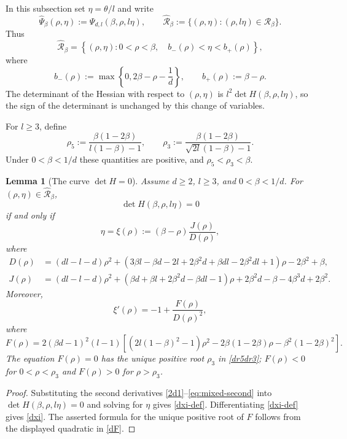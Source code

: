 \documentclass[11pt]{amsart}
\theoremstyle{plain}
\newtheorem{lemma}[theorem]{Lemma}
\numberwithin{equation}{section}
\numberwithin{theorem}{section}
\numberwithin{figure}{section}
\begin{document}
In this subsection set $\eta=\theta/l$ and write
\[
\widehat\Psi_\beta(\rho,\eta):=\Psi_{d,l}(\beta,\rho,l\eta),
\qquad
\widehat{\mathcal R}_\beta:=\{(\rho,\eta):(\rho,l\eta)\in\mathcal R_\beta\}.
\]
Thus
\[
\widehat{\mathcal R}_\beta=
\left\{(\rho,\eta):0<\rho<\beta,
\quad b_-(\rho)<\eta<b_+(\rho)\right\},
\]
where
\[
b_-(\rho):=\max\left\{0,2\beta-\rho-\frac1d\right\},
\qquad b_+(\rho):=\beta-\rho.
\]
The determinant of the Hessian with respect to $(\rho,\eta)$ is $l^2\det H(\beta,\rho,l\eta)$, so the sign of the determinant is unchanged by this change of variables.

For $l\geq3$, define
\begin{equation}
\rho_5:=\frac{\beta(1-2\beta)}{l(1-\beta)-1},
\qquad
\rho_3:=\frac{\beta(1-2\beta)}{\sqrt{2l}(1-\beta)-1}.
\label{dr5dr3}
\end{equation}
Under $0<\beta<1/d$ these quantities are positive, and $\rho_5<\rho_3<\beta$.

\begin{lemma}[The curve $\det H=0$]\label{l26}
Assume $d\geq2$, $l\geq3$, and $0<\beta<1/d$.  For $(\rho,\eta)\in\widehat{\mathcal R}_\beta$,
\begin{equation*}
\det H(\beta,\rho,l\eta)=0
\end{equation*}
if and only if
\begin{equation}
\eta=\xi(\rho):=(\beta-\rho)\frac{J(\rho)}{D(\rho)},
\label{dxi-def}
\end{equation}
where
\begin{align}
D(\rho)&=(dl-l-d)\rho^2
+(3\beta l-\beta d-2l+2\beta^2d+\beta dl-2\beta^2dl+1)\rho-2\beta^2+\beta,
\label{dfd}\\
J(\rho)&=(dl-l-d)\rho^2
+(\beta d+\beta l+2\beta^2d-\beta dl-1)\rho
+2\beta^2d-\beta-4\beta^3d+2\beta^2.
\label{dj}
\end{align}
Moreover,
\begin{equation}
\xi'(\rho)=-1+\frac{F(\rho)}{D(\rho)^2},
\label{dxi}
\end{equation}
where
\begin{equation}
F(\rho)=2(\beta d-1)^2(l-1)
\left[(2l(1-\beta)^2-1)\rho^2
-2\beta(1-2\beta)\rho-\beta^2(1-2\beta)^2\right].
\label{dF}
\end{equation}
The equation $F(\rho)=0$ has the unique positive root $\rho_3$ in \eqref{dr5dr3};
$F(\rho)<0$ for $0<\rho<\rho_3$ and $F(\rho)>0$ for $\rho>\rho_3$.
\end{lemma}

\begin{proof}
Substituting the second derivatives \eqref{2d1}--\eqref{eq:mixed-second} into
$\det H(\beta,\rho,l\eta)=0$ and solving for $\eta$ gives \eqref{dxi-def}.  Differentiating
\eqref{dxi-def} gives \eqref{dxi}.  The asserted formula for the unique positive root of
$F$ follows from the displayed quadratic in \eqref{dF}.
\end{proof}
\end{document}

